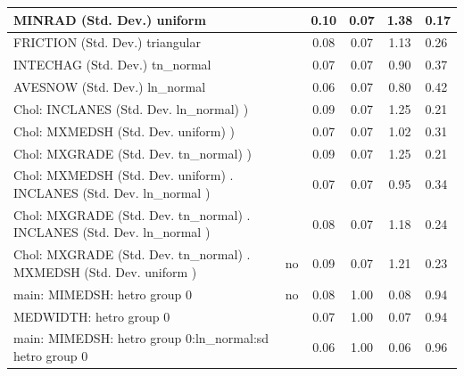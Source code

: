 \begin{table}
\begin{center}
\begin{tabular}{|l|l|c|c|c|l|}
			\hline
			MINRAD (Std. Dev.) uniform &  & 0.10 & 0.07 & 1.38 & 0.17 \\
			\hline
			FRICTION (Std. Dev.) triangular &  & 0.08 & 0.07 & 1.13 & 0.26 \\
			\hline
			INTECHAG (Std. Dev.) tn_normal &  & 0.07 & 0.07 & 0.90 & 0.37 \\
			\hline
			AVESNOW (Std. Dev.) ln_normal &  & 0.06 & 0.07 & 0.80 & 0.42 \\
			\hline
			 Chol: INCLANES (Std. Dev. ln_normal) ) &  & 0.09 & 0.07 & 1.25 & 0.21 \\
			\hline
			 Chol: MXMEDSH (Std. Dev. uniform) ) &  & 0.07 & 0.07 & 1.02 & 0.31 \\
			\hline
			 Chol: MXGRADE (Std. Dev. tn_normal) ) &  & 0.09 & 0.07 & 1.25 & 0.21 \\
			\hline
			 Chol: MXMEDSH (Std. Dev. uniform) . INCLANES (Std. Dev.   ln_normal ) &  & 0.07 & 0.07 & 0.95 & 0.34 \\
			\hline
			 Chol: MXGRADE (Std. Dev. tn_normal) . INCLANES (Std. Dev.   ln_normal ) &  & 0.08 & 0.07 & 1.18 & 0.24 \\
			\hline
			 Chol: MXGRADE (Std. Dev. tn_normal) . MXMEDSH (Std. Dev.   uniform ) & no & 0.09 & 0.07 & 1.21 & 0.23 \\
			\hline
			main: MIMEDSH: hetro group 0 & no & 0.08 & 1.00 & 0.08 & 0.94 \\
			\hline
			MEDWIDTH: hetro group 0 &  & 0.07 & 1.00 & 0.07 & 0.94 \\
			\hline
			main: MIMEDSH: hetro group 0:ln_normal:sd  hetro group 0 &  & 0.06 & 1.00 & 0.06 & 0.96 \\
			\hline
		\end{tabular}
	\end{center}
\end{table}